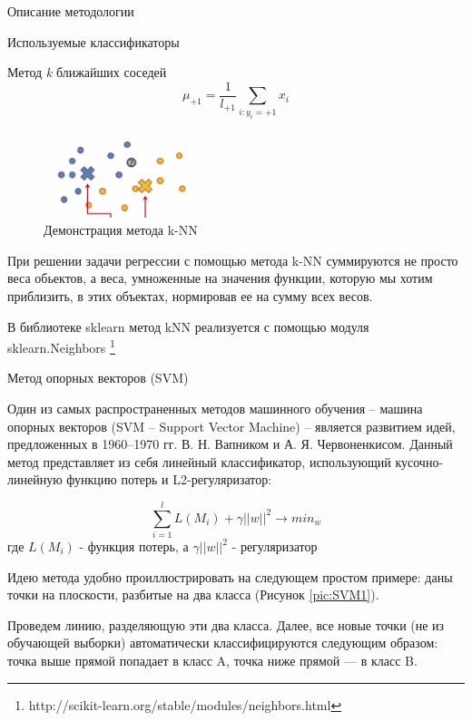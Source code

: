 \begin{section}{Описание методологии}
\begin{subsection}{Используемые классификаторы}
\begin{subsubsection}{Метод \textit{k} ближайших соседей}
\begin{equation}
\mu_{+1} = \frac{1}{l_{+1}} \sum\limits_{i: y_i = +1} x_i
\end{equation}

\begin{figure}[ht!]
\centering
\includegraphics[width=0.4\textwidth]{pics/knn4}
\caption{Демонстрация метода k-NN}
\label{pic:knn4}
\end{figure}

При решении задачи регрессии с помощью метода k-NN  суммируются не просто веса обьектов, а веса, умноженные на значения функции, которую мы хотим приблизить, в этих объектах, нормировав ее на сумму всех весов.

В библиотеке sklearn метод kNN реализуется с помощью модуля sklearn.Neighbors \footnote{http://scikit-learn.org/stable/modules/neighbors.html}

\end{subsubsection}

    \begin{subsubsection}{Метод опорных векторов (SVM)}

Один из самых распространенных методов машинного обучения – машина опорных векторов (SVM – Support Vector Machine) – является развитием идей, предложенных в 1960–1970 гг. В. Н. Вапником и А. Я. Червоненкисом.
Данный метод представляет из себя линейный классификатор, использующий кусочно-линейную функцию потерь и L2-регуляризатор:

\begin{equation}
\sum\limits_{i=1}^l L(M_i) + \gamma ||w||^2 \rightarrow min_{w}
\end{equation}
где $L(M_i)$ - функция потерь, а $\gamma ||w||^2$ - регуляризатор

Идею метода удобно проиллюстрировать на следующем простом примере: даны точки на плоскости, разбитые на два класса (Рисунок \ref{pic:SVM1}).

  Проведем линию, разделяющую эти два класса. Далее, все новые точки (не из обучающей выборки) автоматически классифицируются следующим образом:
точка выше прямой попадает в класс A,
точка ниже прямой — в класс B.


\end{subsubsection}
\end{subsection}
\end{section}
